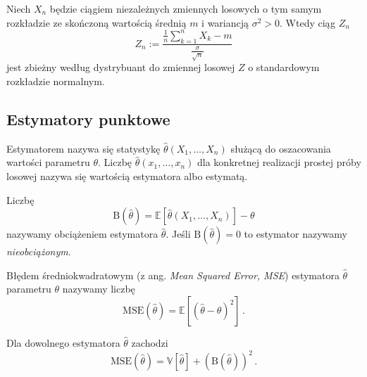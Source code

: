 \documentclass{myclass}
\numberwithin{equation}{subsection}
\begin{document}
\begin{theorem}
Niech \(X_n\) będzie ciągiem niezależnych zmiennych losowych o tym samym rozkładzie ze skończoną
wartością średnią \(m\) i wariancją \(\sigma^2 > 0\). Wtedy ciąg \(Z_n\)
\begin{equation*}
    Z_n := \frac{\frac{1}{n}\sum_{k=1}^n X_k - m}{\frac{\sigma}{\sqrt{n}}}
\end{equation*}
jest zbieżny według dystrybuant do zmiennej losowej \(Z\) o standardowym rozkładzie normalnym.
\end{theorem}


\subsection{Estymatory punktowe}

\begin{definition}[Estymatora]
Estymatorem nazywa się statystykę \(\hat{\theta}(X_1,\ldots,X_n)\) służącą do oszacowania wartości
parametru \(\theta\). Liczbę \(\hat{\theta}(x_1,\ldots,x_n)\) dla konkretnej realizacji prostej
próby losowej nazywa się wartością estymatora albo estymatą.
\end{definition}

\begin{definition}
Liczbę
\begin{equation*}
    \mathrm{B}(\hat{\theta}) = \mathbb{E}[\hat{\theta}(X_1,\ldots,X_n)] - \theta
\end{equation*}
nazywamy obciążeniem estymatora \(\hat\theta\). Jeśli \(\mathrm{B}(\hat{\theta}) = 0\) to estymator
nazywamy \emph{nieobciążonym}.
\end{definition}

\begin{definition}
Błędem średniokwadratowym (z ang. \textit{Mean Squared Error, MSE}) estymatora \(\hat{\theta}\)
parametru \(\theta\) nazywamy liczbę
\begin{equation*}
    \mathrm{MSE}(\hat{\theta}) = \mathbb{E}[(\hat{\theta} - \theta)^2]\,.
\end{equation*}
\end{definition}

\begin{theorem}
Dla dowolnego estymatora \(\hat{\theta}\) zachodzi
\begin{equation*}
    \mathrm{MSE}(\hat{\theta}) = \mathbb{V}[\hat{\theta}] + (\mathrm{B}(\hat{\theta}))^2\,.
\end{equation*}
\end{theorem}
\end{document}
